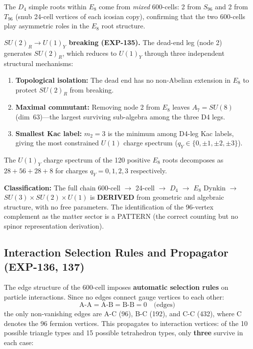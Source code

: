 \documentclass[12pt,a4paper]{article}
\begin{document}
The $D_4$ simple roots within $E_8$ come from \emph{mixed} 600-cells: 2 from $S_{96}$ and 2 from $T_{96}$ (snub 24-cell vertices of each icosian copy), confirming that the two 600-cells play asymmetric roles in the $E_8$ root structure.

\textbf{$SU(2)_R \to U(1)_Y$ breaking (EXP-135).} The dead-end leg (node 2) generates $SU(2)_R$, which reduces to $U(1)_Y$ through three independent structural mechanisms:
\begin{enumerate}
    \item \textbf{Topological isolation:} The dead end has no non-Abelian extension in $E_8$ to protect $SU(2)_R$ from breaking.
    \item \textbf{Maximal commutant:} Removing node 2 from $E_8$ leaves $A_7 = SU(8)$ (dim~63)---the largest surviving sub-algebra among the three D4 legs.
    \item \textbf{Smallest Kac label:} $m_2 = 3$ is the minimum among D4-leg Kac labels, giving the most constrained $U(1)$ charge spectrum ($q_Y \in \{0, \pm 1, \pm 2, \pm 3\}$).
\end{enumerate}
The $U(1)_Y$ charge spectrum of the 120 positive $E_8$ roots decomposes as $28 + 56 + 28 + 8$ for charges $q_Y = 0, 1, 2, 3$ respectively.

\textbf{Classification:} The full chain 600-cell $\to$ 24-cell $\to$ $D_4$ $\to$ $E_8$ Dynkin $\to$ $SU(3) \times SU(2) \times U(1)$ is \textbf{DERIVED} from geometric and algebraic structure, with no free parameters. The identification of the 96-vertex complement as the matter sector is a PATTERN (the correct counting but no spinor representation derivation).

\subsection{Interaction Selection Rules and Propagator (EXP-136, 137)}
\label{sec:interactions}

The edge structure of the 600-cell imposes \textbf{automatic selection rules} on particle interactions. Since no edges connect gauge vertices to each other:
\begin{equation}
\text{A-A} = \text{A-B} = \text{B-B} = 0 \quad \text{(edges)}
\end{equation}
the only non-vanishing edges are A-C (96), B-C (192), and C-C (432), where C denotes the 96 fermion vertices. This propagates to interaction vertices: of the 10 possible triangle types and 15 possible tetrahedron types, only \textbf{three} survive in each case:
\end{document}
